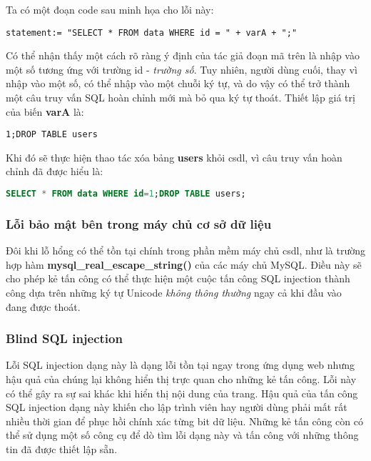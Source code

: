 \documentclass[../main-report.tex]{subfiles}
\begin{document}
\begin{example}
Ta có một đoạn code sau minh họa cho lỗi này:

\begin{lstlisting}
statement:= "SELECT * FROM data WHERE id = " + varA + ";"
\end{lstlisting}
\end{example}

Có thể nhận thấy một cách rõ ràng ý định của tác giả đoạn mã trên là nhập vào một số tương ứng với trường id - \emph{trường số}. Tuy nhiên, người dùng cuối, thay vì nhập vào một số, có thể nhập vào một chuỗi ký tự, và do vậy có thể trở thành một câu truy vấn SQL hoàn chỉnh mới mà bỏ qua ký tự thoát. Thiết lập giá trị của biến \textbf{varA} là:

\begin{lstlisting}
1;DROP TABLE users
\end{lstlisting}

Khi đó sẽ thực hiện thao tác xóa bảng \textbf{users} khỏi \acrshort{csdl}, vì câu truy vấn hoàn chỉnh đã được hiểu là:

\begin{lstlisting}[language=SQL]
SELECT * FROM data WHERE id=1;DROP TABLE users;
\end{lstlisting}

\subsubsection*{Lỗi bảo mật bên trong máy chủ cơ sở dữ liệu}
Đôi khi lỗ hổng có thể tồn tại chính trong phần mềm máy chủ \acrshort{csdl}, như là trường hợp hàm \textbf{mysql\_real\_escape\_string()} của các máy chủ MySQL. Điều này sẽ cho phép kẻ tấn công có thể thực hiện một cuộc tấn công SQL injection thành công dựa trên những ký tự Unicode \emph{không thông thường} ngay cả khi đầu vào đang được thoát.

\subsubsection*{Blind SQL injection}
Lỗi SQL injection dạng này là dạng lỗi tồn tại ngay trong ứng dụng web nhưng hậu quả của chúng lại không hiển thị trực quan cho những kẻ tấn công. Lỗi này có thể gây ra sự sai khác khi hiển thị nội dung của trang. Hậu quả của tấn công SQL injection dạng này khiến cho lập trình viên hay người dùng phải mất rất nhiều thời gian để phục hồi chính xác từng bit dữ liệu. Những kẻ tấn công còn có thể sử dụng một số công cụ để dò tìm lỗi dạng này và tấn công với những thông tin đã được thiết lập sẵn.
\end{document}
